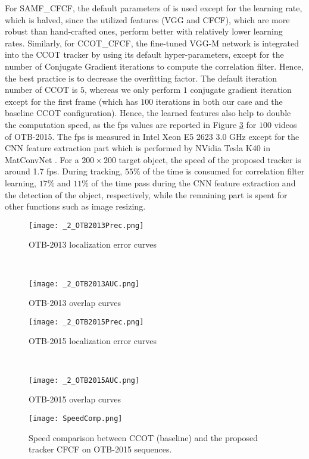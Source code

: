 \documentclass[journal]{IEEEtran}
\begin{document}
For SAMF\_CFCF, the default parameters of \cite{SAMF} is used except for the learning rate, which is halved, since the utilized features (VGG and CFCF), which are more robust than hand-crafted ones, perform better with relatively lower learning rates. Similarly, for CCOT\_CFCF, the fine-tuned VGG-M network is integrated into the CCOT tracker by using its default hyper-parameters, except for the number of Conjugate Gradient iterations to compute the correlation filter. Hence, the best practice is to decrease the overfitting factor. The default iteration number of CCOT is $5$, whereas we only perform $1$ conjugate gradient iteration except for the first frame (which has $100$ iterations in both our case and the baseline CCOT configuration). Hence, the learned features also help to double the computation speed, as the fps values are reported in Figure \ref{Speedy} for $100$ videos of OTB-2015. The fps is measured in Intel Xeon E5 2623 3.0 GHz except for the CNN feature extraction part which is performed by NVidia Tesla K40 in MatConvNet \cite{MatConvNet}. For a $200 \times 200$ target object, the speed of the proposed tracker is around 1.7 fps. During tracking, $55\%$ of the time is consumed for correlation filter learning, $17\%$ and $11\%$ of the time pass during the CNN feature extraction and the detection of the object, respectively, while the remaining part is spent for other functions such as image resizing.
\begin{figure}
\begin{minipage}{1\linewidth}
\centering
\texttt{[image: \_2\_OTB2013Prec.png]} 
\caption{OTB-2013 localization error curves}
\label{OTB2013Prec}
\end{minipage}
\\
\begin{minipage}{1\linewidth}
\centering
\texttt{[image: \_2\_OTB2013AUC.png]} 
\caption{OTB-2013 overlap curves}
\label{OTB2013AUC}
\end{minipage}
\end{figure}
\normalsize
\begin{figure}
\begin{minipage}{1\linewidth}
\centering
\texttt{[image: \_2\_OTB2015Prec.png]} 
\caption{OTB-2015 localization error curves}
\label{OTB2015Prec}
\end{minipage}
\\
\begin{minipage}{1\linewidth}
\centering
\texttt{[image: \_2\_OTB2015AUC.png]} 
\caption{OTB-2015 overlap curves}
\label{OTB2015AUC}
\end{minipage}
\end{figure}
\begin{figure}
\centering
\texttt{[image: SpeedComp.png]}
\caption{Speed comparison between CCOT (baseline) and the proposed tracker CFCF on OTB-2015 sequences.}
\label{Speedy}
\end{figure}
\end{document}
